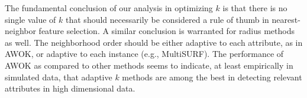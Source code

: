 \documentclass[10pt,letterpaper]{article}
\begin{document}
The fundamental conclusion of our analysis in optimizing $k$ is that there is no single value of $k$ that should necessarily be considered a rule of thumb in nearest-neighbor feature selection. A similar conclusion is warranted for radius methods as well. The neighborhood order should be either adaptive to each attribute, as in AWOK, or adaptive to each instance (e.g., MultiSURF). The performance of AWOK as compared to other methods seems to indicate, at least empirically in simulated data, that adaptive $k$ methods are among the best in detecting relevant attributes in high dimensional data.


\end{document}
